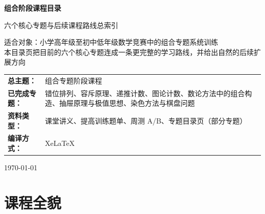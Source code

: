 \documentclass[11pt,a4paper,fontset=fandol]{ctexart}
\begin{document}
\thispagestyle{empty}
\begin{titlepage}
\centering
\vspace*{0.9cm}

\begin{tcolorbox}[
  enhanced,
  width=0.92\textwidth,
  colback=white,
  colframe=mainblue,
  boxrule=1pt,
  arc=0mm,
  left=6mm,
  right=6mm,
  top=8mm,
  bottom=8mm
]
\centering

{\fontsize{24}{30}\selectfont\bfseries 组合阶段课程目录\par}
\vspace{0.65cm}
{\fontsize{17}{22}\selectfont 六个核心专题与后续课程路线总索引\par}

\vspace{1cm}
\begin{tcolorbox}[colback=lightblue,colframe=mainblue,width=0.84\textwidth,boxrule=1pt]
\centering
{\large 适合对象：小学高年级至初中低年级数学竞赛中的组合专题系统训练}\\[0.35em]
{\normalsize 本目录页把目前的六个核心专题连成一条更完整的学习路线，并给出自然的后续扩展方向}
\end{tcolorbox}

\vspace{1.0cm}
\renewcommand{\arraystretch}{1.42}
\begin{tabular}{>{\bfseries}p{3.5cm}p{8cm}}
总主题： & 组合专题阶段课程 \\
已完成专题： & 错位排列、容斥原理、递推计数、图论计数、数论方法中的组合构造、抽屉原理与极值思想、染色方法与棋盘问题 \\
资料类型： & 课堂讲义、提高训练题单、周测 A/B、专题目录页（部分专题） \\
编译方式： & XeLaTeX \\
\end{tabular}

\vspace{0.9cm}
{\large \today\par}
\end{tcolorbox}
\end{titlepage}

\tableofcontents
\newpage

\section{课程全貌}
\end{document}
